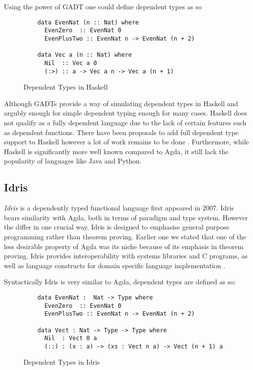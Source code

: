 \documentclass[a4paper,12pt]{report}
\begin{document}
Using the power of GADT one could define dependent types as so

\begin{figure}[H]
  \begin{lstlisting}      
    data EvenNat (n :: Nat) where
      EvenZero  :: EvenNat 0
      EvenPlusTwo :: EvenNat n -> EvenNat (n + 2)
      
    data Vec a (n :: Nat) where
      Nil  :: Vec a 0
      (:>) :: a -> Vec a n -> Vec a (n + 1)
  \end{lstlisting}
  \caption{Dependent Types in Haskell}
\end{figure}

\par
Although GADTs provide a way of simulating dependent types in Haskell and 
argubly enough for simple dependent typing enough for many cases. 
Haskell does not qualify as a fully dependent 
language due to the lack of certain features such as dependent functions. There 
have been proposals to add full dependent type support to Haskell however a lot 
of work remains to be done \cite{dependentHaskell, aRoleForDependentHaskell}. 
Furthermore, while Haskell is significantly more well known compared to Agda, it 
still lack the popularity of languages like Java and Python.

\subsection{Idris}
\textit{Idris} \cite{idris} is a dependently typed functional language first 
appeared in 2007. Idris bears similarity with Agda, both in terms of paradigm 
and type system. However the differ in one crucial way, Idris is designed to 
emphasise general purpose programming rather than theorem proving. Earlier one 
we stated that one of the less desirable property of Agda was its niche because 
of its emphasis in theorem proving. Idris provides 
interoperability with systems libraries and C programs, 
as well as language constructs for domain specific language 
implementation \cite{gpIdris}. 

\par
Syntactically Idris is very similar to Agda, dependent types are defined as so: 
\begin{figure}[H]
  \begin{lstlisting}      
    data EvenNat :  Nat -> Type where
      EvenZero  :: EvenNat 0
      EvenPlusTwo :: EvenNat n -> EvenNat (n + 2)
      
    data Vect : Nat -> Type -> Type where
      Nil  : Vect 0 a
      (::) : (x : a) -> (xs : Vect n a) -> Vect (n + 1) a
  \end{lstlisting}
  \caption{Dependent Types in Idris}
\end{figure}
\end{document}
